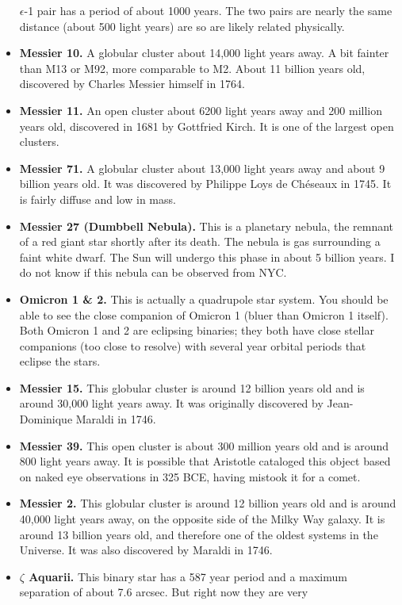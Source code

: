 \begin{itemize}
  $\epsilon$-1 pair has a period of about 1000 years. The two pairs
  are nearly the same distance (about 500 light years) are so are
  likely related physically.
\item {\bf Messier 10.} A globular cluster about 14,000 light years
  away. A bit fainter than M13 or M92, more comparable to M2. About 11
  billion years old, discovered by Charles Messier himself in 1764.
\item {\bf Messier 11.}
  An open cluster about 6200 light years away and 200 million years
  old, discovered in 1681 by Gottfried Kirch. It is one of the largest
  open clusters.
\item {\bf Messier 71.} A globular cluster about 13,000 light years
  away and about 9 billion years old. It was discovered by Philippe
  Loys de Ch{\'e}seaux in 1745. It is fairly diffuse and low in mass.
\item {\bf Messier 27 (Dumbbell Nebula).}
  This is a planetary nebula, the remnant of a red giant star shortly
  after its death. The nebula is gas surrounding a faint white
  dwarf. The Sun will undergo this phase in about 5 billion years. I
  do not know if this nebula can be observed from NYC.
\item {\bf Omicron 1 \& 2.} This is actually a quadrupole star
  system. You should be able to see the close companion of Omicron 1
  (bluer than Omicron 1 itself). Both Omicron 1 and 2 are eclipsing
  binaries; they both have close stellar companions (too close to
  resolve) with several year orbital periods that eclipse the stars.
\item {\bf Messier 15.}
  This globular cluster is around 12 billion years old and is around
30,000 light years away. It was originally discovered by Jean-Dominique
Maraldi in 1746.
\item {\bf Messier 39.}
  This open cluster is about 300 million years old and is around 800
  light years away. It is possible that Aristotle cataloged this
  object based on naked eye observations in 325 BCE, having mistook it
  for a comet.
\item {\bf Messier 2.}
  This globular cluster is around 12 billion years old and is around
40,000 light years away, on the opposite side of the Milky Way
galaxy. It is around 13 billion years old, and therefore one of the
oldest systems in the Universe. It was also discovered by Maraldi in
1746.
\item {\bf $\zeta$ Aquarii.} This binary star has a 587 year period and
a maximum separation of about 7.6 arcsec. But right now they are very

\end{itemize}
